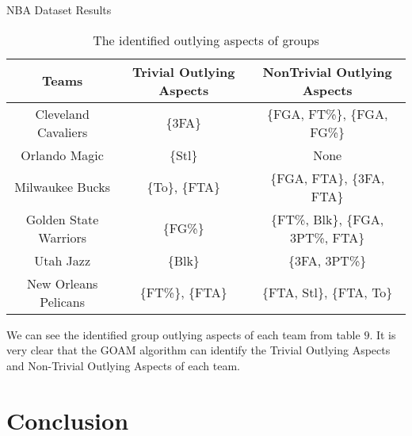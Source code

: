 \documentclass[
size=14pt,
paper=smartboard,  %
mode=present, 		%
display=slides, 	%
style=tuliplab,  	%
pauseslide,
fleqn,leqno]{powerdot}
\begin{document}
\begin{slide}[toc=,bm=]{NBA Dataset Results}
	
	\begin{table}[htbp]
		\setlength{\abovecaptionskip}{0pt}
		\setlength{\belowcaptionskip}{10pt}
		\centering
		\caption{The identified outlying aspects of groups}
		
		\begin{tabular}{ccc}
			\hline
			Teams                   & Trivial Outlying Aspects  & NonTrivial Outlying Aspects    \\
			\hline
			Cleveland Cavaliers     & \{3FA\}                   & \{FGA, FT\%\}, \{FGA, FG\%\} \\
			Orlando Magic           & \{Stl\}                   & None                         \\
			Milwaukee Bucks         & \{To\}, \{FTA\}           & \{FGA, FTA\}, \{3FA, FTA\}     \\
			Golden State Warriors   & \{FG\%\}                  & \{FT\%, Blk\}, \{FGA, 3PT\%, FTA\}\\
			Utah Jazz               & \{Blk\}                   & \{3FA, 3PT\%\}                    \\
			New Orleans Pelicans    & \{FT\%\}, \{FTA\}         & \{FTA, Stl\}, \{FTA, To\}          \\
			\hline
		\end{tabular}
	\end{table}
	
	\begin{note}
		We can see the identified group outlying aspects of each team from table $9$.
		It is very clear that the GOAM algorithm can identify the
		Trivial Outlying Aspects and Non-Trivial Outlying Aspects of each team.
	\end{note}
	
\end{slide}


\section{Conclusion}
\end{document}
